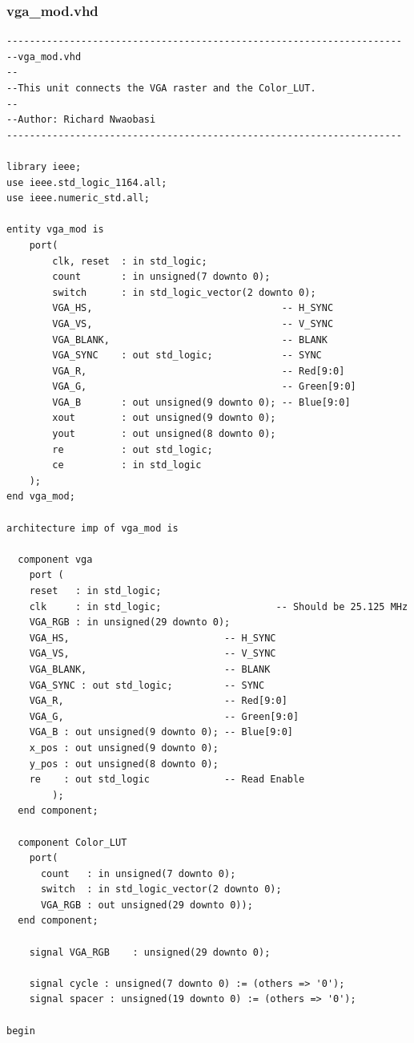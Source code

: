 \documentclass{article}
\begin{document}
\subsubsection{vga\_mod.vhd}							%
\begin{lstlisting}
---------------------------------------------------------------------
--vga_mod.vhd
--
--This unit connects the VGA raster and the Color_LUT.
--
--Author: Richard Nwaobasi
---------------------------------------------------------------------

library ieee;
use ieee.std_logic_1164.all;
use ieee.numeric_std.all;

entity vga_mod is
	port(
		clk, reset	: in std_logic;
		count		: in unsigned(7 downto 0);
		switch		: in std_logic_vector(2 downto 0);
		VGA_HS,                                 -- H_SYNC
		VGA_VS,                                 -- V_SYNC
		VGA_BLANK,                              -- BLANK
		VGA_SYNC	: out std_logic;            -- SYNC
		VGA_R,                                  -- Red[9:0]
		VGA_G,                                  -- Green[9:0]
		VGA_B		: out unsigned(9 downto 0); -- Blue[9:0]
		xout		: out unsigned(9 downto 0);
		yout		: out unsigned(8 downto 0);
		re  		: out std_logic;
		ce  		: in std_logic
	);
end vga_mod;

architecture imp of vga_mod is

  component vga
    port (
    reset   : in std_logic;
    clk     : in std_logic;                    -- Should be 25.125 MHz
    VGA_RGB : in unsigned(29 downto 0);
    VGA_HS,                           -- H_SYNC
    VGA_VS,                           -- V_SYNC
    VGA_BLANK,                        -- BLANK
    VGA_SYNC : out std_logic;         -- SYNC
    VGA_R,                            -- Red[9:0]
    VGA_G,                            -- Green[9:0]
    VGA_B : out unsigned(9 downto 0); -- Blue[9:0]
    x_pos : out unsigned(9 downto 0);
    y_pos : out unsigned(8 downto 0);
    re    : out std_logic             -- Read Enable
		);
  end component;
	
  component Color_LUT
    port(
      count   : in unsigned(7 downto 0);
      switch  : in std_logic_vector(2 downto 0);
      VGA_RGB : out unsigned(29 downto 0));
  end component;

	signal VGA_RGB    : unsigned(29 downto 0);

	signal cycle : unsigned(7 downto 0) := (others => '0');
	signal spacer : unsigned(19 downto 0) := (others => '0');

begin
  

\end{lstlisting}
\end{document}
